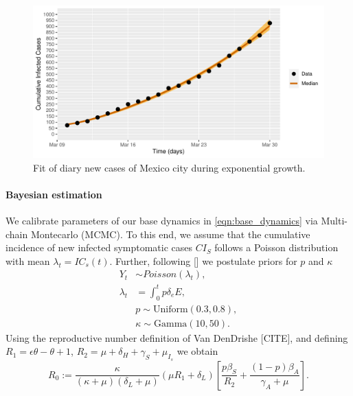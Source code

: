 \begin{figure}[htb]
    \centering
    \includegraphics[scale=0.7, keepaspectratio]{./cdmx_CIs_data_begining_fit}
    \caption{%
        Fit of diary new cases of Mexico city
        during exponential growth.
    }
    \label{fig:data_CDMX_fitting}
\end{figure}
%

\paragraph{Bayesian estimation}
We calibrate parameters of our base dynamics in
\eqref{eqn:base_dynamics} via Multi-chain Montecarlo (MCMC).
To this end, we assume that the cumulative
incidence of new infected symptomatic cases $CI_S$
follows a Poisson distribution with mean $\lambda_t = IC_s(t)$. Further,
following [] we postulate priors for $p$ and $\kappa$
\begin{equation}
    \label{eqn:boservation_model}
    \begin{aligned}
        Y_t & \sim Poisson(\lambda_t),
        \\
        \lambda_t
        &=
        \int_{0}^t p \delta_e E ,
        \\
        & p \sim \text{Uniform} (0.3, 0.8),
        \\
        & \kappa \sim \text{Gamma}(10, 50).
    \end{aligned}
\end{equation}
%
\textbf{}
Using the reproductive number definition
of Van DenDrishe [CITE],
and defining $R_1 = \epsilon\theta- \theta +1$,
$R_2 = \mu + \delta_H+\gamma_S+\mu_{I_{s}}$
we obtain
\begin{equation*}
    \label{eqn:reproductive_number}
    R_0 :=
  \frac{\kappa}{(\kappa+\mu)(\delta_L+\mu)}\left(\mu R_1+\delta_L\right)
  \left[\frac{p\beta_S}{R_2}
  +\frac{(1-p)\beta_A}{\gamma_A+\mu}\right].
\end{equation*}

